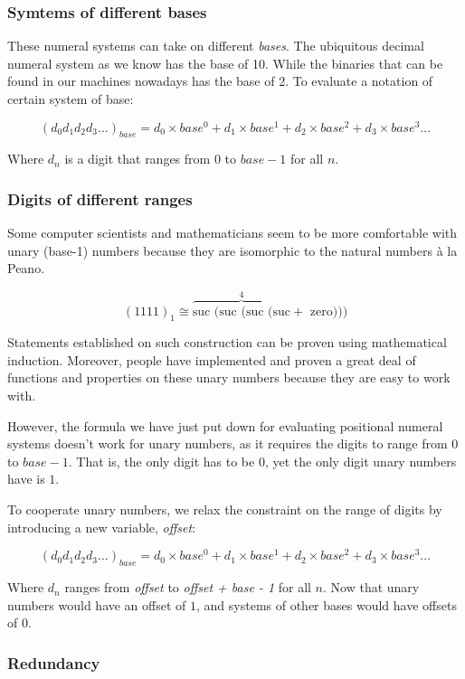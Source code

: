\documentclass[12pt, a4paper]{article}
\begin{document}
\subsubsection{Symtems of different bases}

These numeral systems can take on different \textit{bases}. The ubiquitous decimal
numeral system as we know has the base of 10. While the binaries that can be found
in our machines nowadays has the base of 2. To evaluate a notation of certain
system of base:

$$
    ({d_0d_1d_2d_3...})_{base}
    =
    d_0\times base^0 + d_1\times base^1 + d_2\times base^2 + d_3\times base^3 ...
$$

Where $ d_{n} $ is a digit that ranges from $ 0 $ to $ base - 1 $ for all $ n $.


\subsubsection{Digits of different ranges}

Some computer scientists and mathematicians seem to be more comfortable with
unary (base-1) numbers because they are isomorphic to the natural numbers à la Peano.

$$
    (1111)_{1} \cong
        \overbrace{\text{suc (suc (suc (suc}}^4 + \text{ zero)))}
$$

Statements established on such construction can be proven using mathematical
induction. Moreover, people have implemented and proven a great deal of functions
and properties on these unary numbers because they are easy to work with.

However, the formula we have just put down for evaluating positional numeral systems
doesn't work for unary numbers, as it requires the digits to range from $ 0 $ to
$ base - 1 $. That is, the only digit has to be $ 0 $, yet the only digit unary
numbers have is $ 1 $.

To cooperate unary numbers, we relax the constraint on the range of digits
by introducing a new variable, \textit{offset}:

$$
    ({d_0d_1d_2d_3...})_{base}
    =
    d_0\times base^0 + d_1\times base^1 + d_2\times base^2 + d_3\times base^3 ...
$$

Where $ d_{n} $ ranges from \textit{offset} to \textit{offset + base - 1} for
all $ n $. Now that unary numbers would have an offset of $ 1 $,
and systems of other bases would have offsets of $ 0 $.

\subsubsection{Redundancy}
\end{document}
